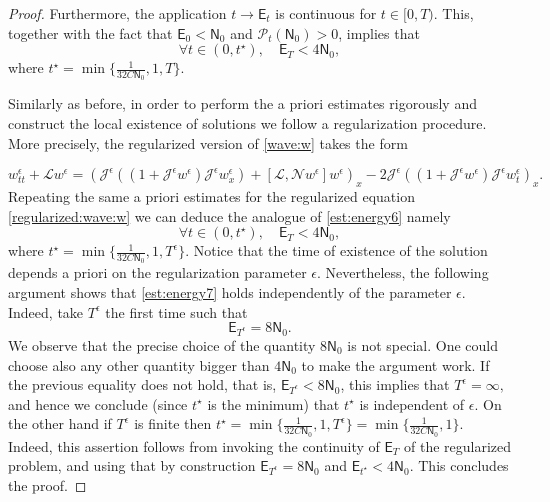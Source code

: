 \documentclass[final,11pt,a4paper,reqno]{amsart}
\theoremstyle{definition}
\begin{document}
\begin{proof}
Furthermore, the application $t\to\mathsf{E}_{t}$ is continuous for $t\in [0,T)$. This, together with the fact that
$\mathsf{E}_{0}<\mathsf{N}_{0}$ and $\mathcal{P}_{t}(\mathsf{N}_{0})>0$, implies that 
\begin{equation}\label{est:energy6}
	\forall t\in  (0, t^{\star}), \quad  \mathsf{E}_{T}< 4 \mathsf{N}_{0},  
	\end{equation}
where $t^{\star}=\displaystyle\min\{\frac{1}{32C\mathsf{N}_{0}},1,T \}$.

Similarly as before, in order to perform the a priori estimates rigorously and construct the local existence of solutions we follow  a regularization procedure. More precisely, the regularized version of \eqref{wave:w}  takes the form

\begin{equation}\label{regularized:wave:w}
w^{\epsilon}_{tt}+\mathscr{L}w^{\epsilon}=\left(\mathcal{J}^{\epsilon}\left((1+\mathcal{J}^{\epsilon}w^{\epsilon})\mathcal{J}^{\epsilon}w^{\epsilon}_x\right)+\left[\mathscr{L},\mathscr{N}w^{\epsilon}\right]w^{\epsilon}\right)_{x}-2\mathcal{J}^{\epsilon}\left((1+\mathcal{J}^{\epsilon}w^{\epsilon})\mathcal{J}^{\epsilon}w^{\epsilon}_t\right)_x.
\end{equation}
Repeating the same a priori estimates for the regularized  equation \eqref{regularized:wave:w} we can deduce the analogue of \eqref{est:energy6} namely
 \begin{equation}\label{est:energy7}
 	\forall t\in  (0, t^{\star}), \quad  \mathsf{E}_{T}< 4 \mathsf{N}_{0},  
 \end{equation}
where $t^{\star}=\displaystyle\min\{\frac{1}{32C\mathsf{N}_{0}},1,T^{\epsilon} \}$. Notice that the time of existence of the solution depends a priori on the regularization parameter $\epsilon$. Nevertheless, the following argument shows that \eqref{est:energy7} holds independently of the parameter $\epsilon$. Indeed, take $T^{\epsilon}$ the first time such that 
\[ \mathsf{E}_{T^{\epsilon}}=8\mathsf{N}_{0}.\]
We observe that the precise choice of the quantity $8\mathsf{N}_{0}$ is not special. One could choose also any other quantity bigger than $ 4\mathsf{N}_{0}$ to make the argument work.
If the previous equality does not hold, that is, $\mathsf{E}_{T^{\epsilon}}<8\mathsf{N}_{0}$, this implies that $T^{\epsilon}=\infty,$ and hence we conclude (since $t^{\star}$ is the minimum) that $t^\star$ is independent of $\epsilon$. On the other hand if $T^{\epsilon}$ is finite then $t^{\star}=\displaystyle\min\{\frac{1}{32C\mathsf{N}_{0}},1,T^{\epsilon} \}=\displaystyle\min\{\frac{1}{32C\mathsf{N}_{0}},1\}$. Indeed, this assertion follows from  invoking the continuity of $\mathsf{E}_{T}$ of the regularized problem, and using that by construction $\mathsf{E}_{T^{\epsilon}}=8\mathsf{N}_{0}$ and $\mathsf{E}_{t^{\star}}<4\mathsf{N}_{0}$. This concludes the proof. 

\end{proof}
\end{document}
